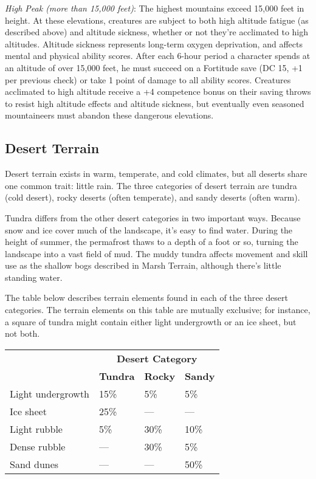 \textit{High Peak (more than 15,000 feet)}: The highest mountains exceed 15,000 feet in height. At these elevations, creatures are subject to both high altitude fatigue (as described above) and altitude sickness, whether or not they're acclimated to high altitudes\textit{. }Altitude sickness represents long-term oxygen deprivation, and affects mental and physical ability scores. After each 6-hour period a character spends at an altitude of over 15,000 feet, he must succeed on a Fortitude save (DC 15, +1 per previous check) or take 1 point of damage to all ability scores. Creatures acclimated to high altitude receive a +4 competence bonus on their saving throws to resist high altitude effects and altitude sickness, but eventually even seasoned mountaineers must abandon these dangerous elevations. 
				
\subsection{Desert Terrain}

				
Desert terrain exists in warm, temperate, and cold climates, but all deserts share one common trait: little rain. The three categories of desert terrain are tundra (cold desert), rocky deserts (often temperate), and sandy deserts (often warm).
				
Tundra differs from the other desert categories in two important ways. Because snow and ice cover much of the landscape, it's easy to find water. During the height of summer, the permafrost thaws to a depth of a foot or so, turning the landscape into a vast field of mud. The muddy tundra affects movement and skill use as the shallow bogs described in Marsh Terrain, although there's little standing water.
				
The table below describes terrain elements found in each of the three desert categories. The terrain elements on this table are mutually exclusive; for instance, a square of tundra might contain either light undergrowth or an ice sheet, but not both.

\begin{tabular}{llll}
 & \multicolumn{3}{c}{\textbf{Desert Category}}\\
 & \textbf{Tundra} & \textbf{Rocky} & \textbf{Sandy} \\
Light undergrowth & 15\% & 5\% & 5\%\\
Ice sheet & 25\% & --- & ---\\
Light rubble & 5\% & 30\% & 10\%\\
Dense rubble & --- & 30\% & 5\%\\
Sand dunes & --- & --- & 50\%\\
\end{tabular}

